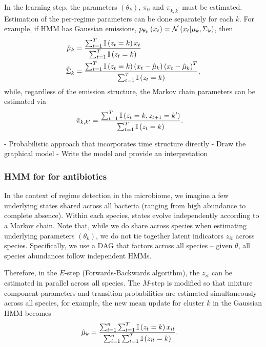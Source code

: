 \documentclass{article}
\begin{document}
In the learning step, the parameters $\left(\theta_{k}\right)$, $\pi_0$ and
$\pi_{k, k^{\prime}}$ must be estimated. Estimation of the per-regime parameters
can be done separately for each $k$. For example, if HMM has Gaussian emissions,
$p_{\theta_{k}}\left(x_{t}\right) = \mathcal{N}\left(x_{t} \vert \mu_{k},
\Sigma_{k}\right)$, then
\begin{align*}
  \hat{\mu}_{k} &= \frac{\sum_{t = 1}^{T} \mathbb{I}\left({z_{t} = k}\right)x_{t}}{\sum_{t = 1}^{T}\mathbb{I}\left({z_{t} = k}\right)} \\
  \hat{\Sigma}_{k} &= \frac{\sum_{t = 1}^{T} \mathbb{I}\left({z_{t} = k}\right)\left(x_{t} - \hat{\mu}_{k}\right)\left(x_{t} - \hat{\mu}_{k}\right)^{T}}
      {\sum_{t = 1}^{T} \mathbb{I}\left({z_{t} = k}\right)},
\end{align*}
while, regardless of the emission structure, the Markov chain parameters can be
estimated via
\begin{align*}
  \hat{\pi}_{k, k^{\prime}} &= \frac{\sum_{t = 1}^{T} \mathbb{I}\left({z_{t} = k, z_{t + 1} = k^{\prime}}\right)}{\sum_{t = 1}^{T} \mathbb{I}\left({z_{t} = k}\right)}.
\end{align*}

- Probabilistic approach that incorporates time structure directly
- Draw the graphical model
- Write the model and provide an interpretation

\subsubsection{HMM for for antibiotics}
\label{subsubsec:hmm_for_antibiotics}

In the context of regime detection in the microbiome, we imagine a few
underlying states shared across all bacteria (ranging from high abundance to
complete absence). Within each species, states evolve independently according to
a Markov chain. Note that, while we do share across species when estimating
underlying parameters $\left(\theta_{k}\right)$, we do not tie together latent
indicators $z_{it}$ across species. Specifically, we use a DAG that factors
across all species -- given $\theta$, all species abundances follow independent
HMMs.

Therefore, in the $E$-step (Forwards-Backwards algorithm), the $z_{it}$ can be
estimated in parallel across all species. The $M$-step is modified so that
mixture component parameters and transition probabilities are estimated
simultaneously across all species, for example, the new mean update for cluster
$k$ in the Gaussian HMM becomes
\begin{align*}
\hat{\mu}_{k} &= \frac{\sum_{i = 1}^{n}\sum_{t = 1}^{T} \mathbb{I}\left({z_{t} = k}\right)x_{it}}{\sum_{i = 1}^{n}\sum_{t = 1}^{T} \mathbb{I}\left({z_{it} = k}\right)}.
\end{align*}
\end{document}
